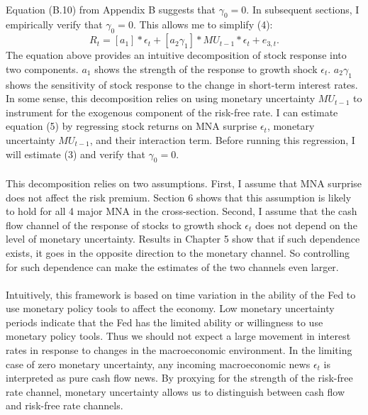 \documentclass[12pt]{article}
\begin{document}
\paragraph{}
Equation (B.10) from Appendix B suggests that $\gamma_0=0$. In subsequent sections, I empirically verify that $\gamma_0=0$. This allows me to simplify (4):
\begin{equation}
    R_t = [a_1]*\epsilon_t + [a_2\gamma_1]*MU_{t-1}*\epsilon_t + e_{3,t}.
\end{equation}
The equation above provides an intuitive decomposition of stock response into two components. $a_1$ shows the strength of the response to growth shock $\epsilon_t$. $a_2\gamma_1$ shows the sensitivity of stock response to the change in short-term interest rates. In some sense, this decomposition relies on using monetary uncertainty $MU_{t-1}$ to instrument for the exogenous component of the risk-free rate. I can estimate equation (5) by regressing stock returns on MNA surprise $\epsilon_t$, monetary uncertainty $MU_{t-1}$, and their interaction term. Before running this regression, I will estimate (3) and verify that $\gamma_0=0$.
\paragraph{}
This decomposition relies on two assumptions. First, I assume that MNA surprise does not affect the risk premium. Section 6 shows that this assumption is likely to hold for all 4 major MNA in the cross-section. Second, I assume that the cash flow channel of the response of stocks to growth shock $\epsilon_t$ does not depend on the level of monetary uncertainty. Results in Chapter 5 show that if such dependence exists, it goes in the opposite direction to the monetary channel. So controlling for such dependence can make the estimates of the two channels even larger.
\paragraph{}
Intuitively, this framework is based on time variation in the ability of the Fed to use monetary policy tools to affect the economy. Low monetary uncertainty periods indicate that the Fed has the limited ability or willingness to use monetary policy tools. Thus we should not expect a large movement in interest rates in response to changes in the macroeconomic environment. In the limiting case of zero monetary uncertainty, any incoming macroeconomic news $\epsilon_t$ is interpreted as pure cash flow news. By proxying for the strength of the risk-free rate channel, monetary uncertainty allows us to distinguish between cash flow and risk-free rate channels.
\end{document}
